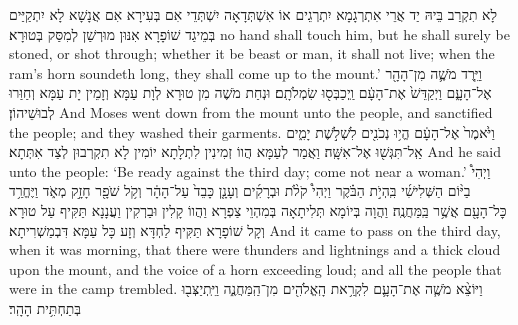 {{לָא תִקְרַב בֵּיהּ יַד אֲרֵי אִתְרְגָמָא יִתְרְגֵים אוֹ אִשְׁתְּדָאָה יִשְׁתְּדֵי אִם בְּעִירָא אִם אֲנָשָׁא לָא יִתְקַיַּים בְּמֵיגַד שׁוֹפָרָא אִנּוּן מוּרְשַׁן לְמִסַּק בְּטוּרָא׃}
{no hand shall touch him, but he shall surely be stoned, or shot through; whether it be beast or man, it shall not live; when the ram’s horn soundeth long, they shall come up to the mount.’}{}
{וַיֵּ֧רֶד מֹשֶׁ֛ה מִן־הָהָ֖ר אֶל־הָעָ֑ם וַיְקַדֵּשׁ֙ אֶת־הָעָ֔ם וַֽיְכַבְּס֖וּ שִׂמְלֹתָֽם׃
}
{וּנְחַת מֹשֶׁה מִן טוּרָא לְוָת עַמָּא וְזָמֵין יָת עַמָּא וְחַוַּרוּ לְבוּשֵׁיהוֹן׃}
{And Moses went down from the mount unto the people, and sanctified the people; and they washed their garments.}{}
{וַיֹּ֙אמֶר֙ אֶל־הָעָ֔ם הֱי֥וּ נְכֹנִ֖ים לִשְׁלֹ֣שֶׁת יָמִ֑ים אַֽל־תִּגְּשׁ֖וּ אֶל־אִשָּֽׁה׃
}
{וַאֲמַר לְעַמָּא הֲווֹ זְמִינִין לִתְלָתָא יוֹמִין לָא תִקְרְבוּן לְצַד אִתְּתָא׃}
{And he said unto the people: ‘Be ready against the third day; come not near a woman.’}{}
{וַיְהִי֩ בַיּ֨וֹם הַשְּׁלִישִׁ֜י בִּֽהְיֹ֣ת הַבֹּ֗קֶר וַיְהִי֩ קֹלֹ֨ת וּבְרָקִ֜ים וְעָנָ֤ן כָּבֵד֙ עַל־הָהָ֔ר וְקֹ֥ל שֹׁפָ֖ר חָזָ֣ק מְאֹ֑ד וַיֶּחֱרַ֥ד כׇּל־הָעָ֖ם אֲשֶׁ֥ר בַּֽמַּחֲנֶֽה׃
}
{וַהֲוָה בְּיוֹמָא תְּלִיתָאָה בְּמִהְוֵי צַפְרָא וַהֲווֹ קָלִין וּבַרְקִין וַעֲנָנָא תַּקִּיף עַל טוּרָא וְקָל שׁוֹפָרָא תַּקִּיף לַחְדָּא וְזָע כָּל עַמָּא דִּבְמַשְׁרִיתָא׃}
{And it came to pass on the third day, when it was morning, that there were thunders and lightnings and a thick cloud upon the mount, and the voice of a horn exceeding loud; and all the people that were in the camp trembled.}{}
{וַיּוֹצֵ֨א מֹשֶׁ֧ה אֶת־הָעָ֛ם לִקְרַ֥את הָֽאֱלֹהִ֖ים מִן־הַֽמַּחֲנֶ֑ה וַיִּֽתְיַצְּב֖וּ בְּתַחְתִּ֥ית הָהָֽר׃
}}
